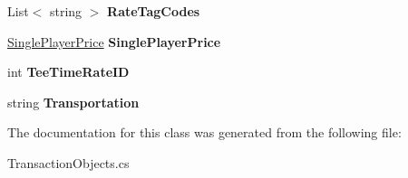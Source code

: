 \begin{DoxyCompactItemize}
List$<$ string $>$ {\bfseries Rate\+Tag\+Codes}
\item 
\mbox{\label{class_golf_now_a_p_i_handler_1_1_rate_a5493d2fdc91d011ca06078cfb9e02646}} 
\mbox{\hyperlink{class_golf_now_a_p_i_handler_1_1_single_player_price}{Single\+Player\+Price}} {\bfseries Single\+Player\+Price}
\item 
\mbox{\label{class_golf_now_a_p_i_handler_1_1_rate_a9036f59d8a954d0331ccd2c1b88d52c6}} 
int {\bfseries Tee\+Time\+Rate\+ID}
\item 
\mbox{\label{class_golf_now_a_p_i_handler_1_1_rate_a280ce535f62dc8f732d8a2926a3e170a}} 
string {\bfseries Transportation}
\end{DoxyCompactItemize}


The documentation for this class was generated from the following file\+:\begin{DoxyCompactItemize}
\item 
Transaction\+Objects.\+cs\end{DoxyCompactItemize}
